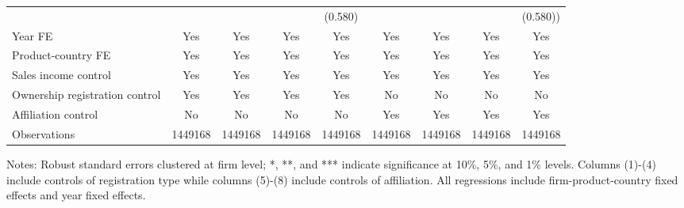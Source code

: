 \documentclass[12pt]{article}
\begin{document}
\begin{table}
\begin{threeparttable}
\begin{tabular}{lcccccccc}
			&       &       &       & (0.580) &&&&(0.580))\\
			Year FE  &  Yes   & Yes   & Yes   & Yes & Yes   & Yes   & Yes   & Yes\\
			Product-country FE &  Yes   & Yes   & Yes   & Yes & Yes   & Yes   & Yes   & Yes\\
			Sales income control &  Yes   & Yes   & Yes   & Yes & Yes   & Yes   & Yes   & Yes\\
			Ownership registration control &  Yes   & Yes & Yes  & Yes & No & No & No & No\\
			Affiliation control & No & No & No & No &  Yes  & Yes & Yes  & Yes \\
			Observations & 1449168 & 1449168 & 1449168 & 1449168 & 1449168 & 1449168 & 1449168 & 1449168\\
			\bottomrule
		\end{tabular}
		\begin{tablenotes}
			\footnotesize
			\item[Notes:] Robust standard errors clustered at firm level; *, **, and *** indicate significance at 10\%, 5\%, and 1\% levels. Columns (1)-(4) include controls of registration type while columns (5)-(8) include controls of affiliation. All regressions include firm-product-country fixed effects and year fixed effects.
		\end{tablenotes}
	\end{threeparttable}
	\label{tab.robust.ownership}
\end{table}
\end{document}
